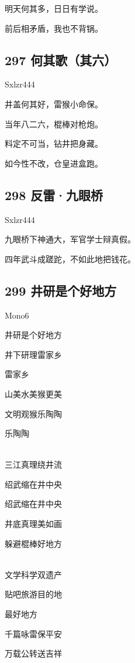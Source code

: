 明天何其多，日日有学说。

前后相矛盾，我也不背锅。

\hypertarget{ux4f55ux5176ux6b4cux5176ux516d}{%
\subsection{297 何其歌（其六）}\label{ux4f55ux5176ux6b4cux5176ux516d}}

{Sxlzr444}

井盖何其好，雷猴小命保。

当年八二六，棍棒对枪炮。

料定不可当，钻井把身藏。

如今性不改，仓皇进盒跑。

\hypertarget{ux53cdux96f7ux4e5dux773cux6865}{%
\subsection{298 反雷·九眼桥}\label{ux53cdux96f7ux4e5dux773cux6865}}

{Sxlzr444}

九眼桥下神通大，军官学士辩真假。

四年武斗成蹉跎，不如此地把钱花。

\hypertarget{ux4e95ux7814ux662fux4e2aux597dux5730ux65b9}{%
\subsection{299
井研是个好地方}\label{ux4e95ux7814ux662fux4e2aux597dux5730ux65b9}}

{Mono6}

井研是个好地方

井下研理雷家乡

雷家乡

山美水美猴更美

文明观猴乐陶陶

乐陶陶

~\\
三江真理绕井流

绍武缩在井中央

绍武缩在井中央

井底真理美如画

躲避棍棒好地方

~\\
文学科学双遗产

贴吧旅游目的地

最好地方

千篇咏雷保平安

万载公转送吉祥

